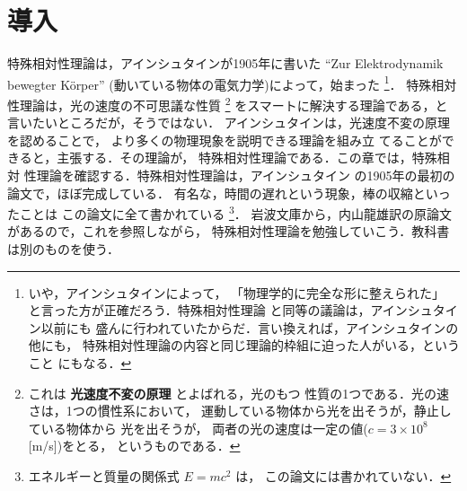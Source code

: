﻿%
    \section{導入}
    特殊相対性理論は，アインシュタインが1905年に書いた
    “Zur Elektrodynamik bewegter K\"{o}rper”
    (動いている物体の電気力学)によって，始まった
        \footnote{
            いや，アインシュタインによって，
            「物理学的に完全な形に整えられた」
            と言った方が正確だろう．特殊相対性理論
            と同等の議論は，アインシュタイン以前にも
            盛んに行われていたからだ．言い換えれば，アインシュタインの他にも，
            特殊相対性理論の内容と同じ理論的枠組に迫った人がいる，ということ
            にもなる．
        }．
    特殊相対性理論は，光の速度の不可思議な性質
        \footnote{
                これは \textbf{光速度不変の原理} とよばれる，光のもつ
                性質の1つである．光の速さは，1つの慣性系において，
                運動している物体から光を出そうが，静止している物体から
                光を出そうが，
                両者の光の速度は一定の値($c=3\times10^{8}$[m/s])をとる，
                というものである．
        }
    をスマートに解決する理論である，と言いたいところだが，そうではない．
    アインシュタインは，光速度不変の原理を認めることで，
    より多くの物理現象を説明できる理論を組み立
    てることができると，主張する．その理論が，
    特殊相対性理論である．この章では，特殊相対
    性理論を確認する．特殊相対性理論は，アインシュタイン
    の1905年の最初の論文で，ほぼ完成している．
    有名な，時間の遅れという現象，棒の収縮といったことは
    この論文に全て書かれている
        \footnote{
            エネルギーと質量の関係式 $E=mc^{2}$ は，
            この論文には書かれていない．
        }．
    岩波文庫から，内山龍雄訳の原論文があるので，これを参照しながら，
    特殊相対性理論を勉強していこう．教科書は別のものを使う．

